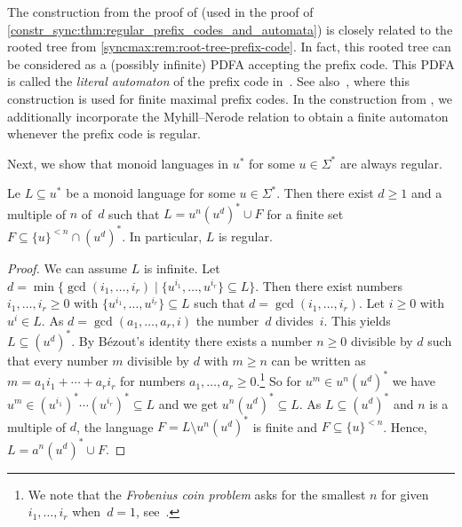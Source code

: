\begin{remark} \label{syncmax:rem:general-aut-prefix-code}
	The construction from the proof of
	(used in the proof of \cref{constr_sync:thm:regular_prefix_codes_and_automata})
	is closely related to the rooted tree from
	\cref{syncmax:rem:root-tree-prefix-code}.
	In fact, this rooted tree can be considered as a (possibly infinite)
	PDFA accepting the prefix code.
	This PDFA is called the \emph{literal automaton}
	of the prefix code in~\cite[Sect.~3.2]{DBLP:books/daglib/0025093}.
	See also~\cite[Sect.~1.3 \& 4.3.8]{DBLP:phd/hal/Ryzhikov20},
	where this construction is used for finite maximal prefix codes.
	In the construction from
	,
	we additionally incorporate the Myhill--Nerode relation to obtain a finite automaton whenever the prefix code is regular.
\end{remark}

Next, we show that monoid languages in $u^*$ for some $u \in \Sigma^*$ are always regular.

\begin{proposition}\label{constrsync:thm:sparsemonoid-regular}
	Le $L \subseteq u^*$ be a monoid language for some $u \in \Sigma^*$.
	Then there exist $d \ge 1$ and a multiple of $n$ of~$d$
	such that $L = u^n(u^d)^* \cup F$
	for a finite set $F \subseteq \{ u \}^{< n} \cap (u^d)^*$. 
	In particular, $L$ is regular.
\end{proposition}
\begin{proof}
	We can assume $L$ is infinite.
	Let $d = \min\{ \gcd(i_1, \ldots, i_r) \mid \{ u^{i_1}, \ldots, u^{i_r} \} \subseteq L\}$.		
	Then there exist numbers $i_1, \ldots, i_r \ge 0$ with $\{ u^{i_1}, \ldots, u^{i_r} \} \subseteq L$
	such that $d = \gcd( i_1, \ldots, i_r )$.
	Let $i \ge 0$ with $u^i \in L$.
	As $d = \gcd( a_1, \ldots, a_r, i )$ 
	the number~$d$ divides~$i$.
	This yields $L \subseteq (u^d)^*$.	
	By B\'{e}zout's identity 
	there exists a number $n \ge 0$ divisible by $d$ such that every
	number $m$ divisible by $d$
	with $m \ge n$ can be written as $m = a_1 i_1 + \cdots + a_r i_r$
	for numbers $a_1, \ldots, a_r \ge 0$.\footnote{We note that the \emph{Frobenius coin problem}
		asks for the smallest $n$ for given $i_1, \ldots, i_r$ when~$d = 1$, see~\cite{Alfonsis05}.}
	So for $u^m \in u^n(u^d)^*$ we have
	$u^m \in  (u^{i_1})^* \cdots (u^{i_r})^* \subseteq L$
	and we get $u^n (u^d)^* \subseteq L$.
	As $L \subseteq (u^d)^*$ and $n$ is a multiple of $d$, the language
	$F = L \setminus u^n (u^d)^*$ is finite and $F \subseteq \{u\}^{< n}$.
	Hence, $L = a^n (u^d)^* \cup F$.
\end{proof}

